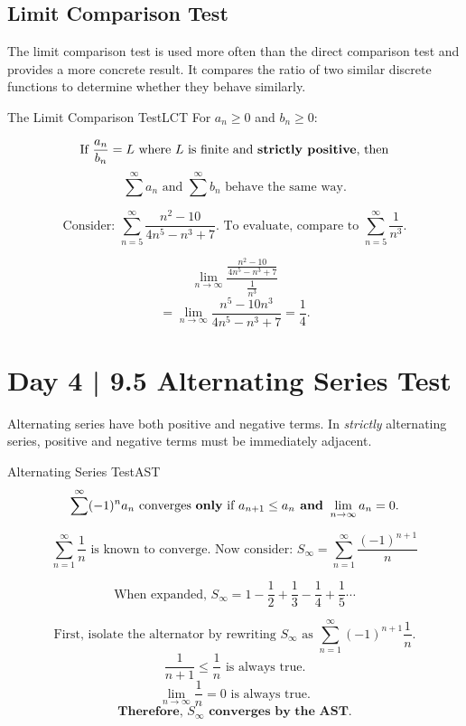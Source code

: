 \documentclass[10pt]{article}
\theoremstyle{definition}
\begin{document}
\subsection{Limit Comparison Test}
The limit comparison test is used more often than the direct comparison test and provides a more concrete result. It compares the ratio of two similar discrete functions to determine whether they behave similarly.

\begin{theorem}{The Limit Comparison Test}{LCT}
    For $a_n \ge 0$ and $b_n \ge 0$:
    
\[\text{If } \frac{a_n}{b_n}=L \text{ where $L$ is finite and \textbf{strictly positive}, then}\]
\vspace{-0.3cm}
\[\sum^{\infty} a_n \text{ and } \sum^{\infty} b_n \text{ behave the same way.}\]
    
\end{theorem}

\[\text{Consider: } \sum_{n=5}^{\infty} \frac{n^2-10}{4n^5-n^3+7}. \text{ To evaluate, compare to } \sum_{n=5}^{\infty} \frac{1}{n^3}.\]

\[\lim_{n \to \infty} \frac{\frac{n^2-10}{4n^5-n^3+7}}{\frac{1}{n^3}}\]
\[=\lim_{n \to \infty} \frac{n^5-10n^3}{4n^5-n^3+7}=\frac{1}{4}.\]

\vspace{1cm}



\section{Day 4 | 9.5 Alternating Series Test}
Alternating series have both positive and negative terms. In \emph{strictly} alternating series, positive and negative terms must be immediately adjacent.

\begin{theorem}{Alternating Series Test}{AST}
\[\sum^{\infty} (-1)^n a_n \text{ converges \textbf{only} if } a_{n+1} \le a_n \textbf{ and } \lim_{n \to \infty} a_n=0.\] 
\end{theorem}

\[\sum_{n=1}^{\infty} \frac{1}{n} \text{ is known to converge. Now consider: } S_\infty=\sum_{n=1}^{\infty} \frac{(-1)^{n+1}}{n}\]

\[\text{When expanded, } S_\infty=1-\frac{1}{2}+\frac{1}{3}-\frac{1}{4}+\frac{1}{5} \cdots \]

\[\text{First, isolate the alternator by rewriting $S_\infty$ as } \sum_{n=1}^{\infty} (-1)^{n+1}\frac{1}{n}.\]
\[\frac{1}{n+1} \le \frac{1}{n} \text{ is always true.}\]
\[\lim_{n \to \infty} \frac{1}{n}=0 \text{ is always true.}\]
\[\textbf{Therefore, $S_\infty$ converges by the AST.}\]
\end{document}
